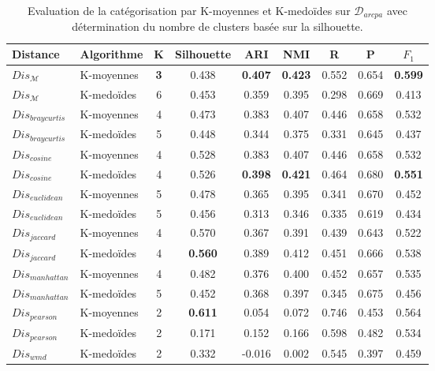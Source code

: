 \begin{table}[!htb]
	\centering \footnotesize
	\begin{tabular}[pos]{|l|l|c|c|c|c|c|c|c|}
		\hline
		{Distance}& {Algorithme}& {K}& {Silhouette}& {ARI} & {NMI} & {R} & {P} & ${F_1}$ \\ \hline
		$Dis_\mathcal{M}$          & K-moyennes    & \textbf{3} & 0.438      & \textbf{0.407} & \textbf{0.423} & 0.552  & 0.654     & \textbf{0.599} \\ \hline
		$Dis_\mathcal{M}$          & K-medoïdes  & 6 & 0.453      & 0.359 & 0.395 & 0.298  & 0.669     & 0.413 \\ \hline
		$Dis_{braycurtis}$ & K-moyennes    & 4 & 0.473      & 0.383 & 0.407 & 0.446  & 0.658     & 0.532 \\ \hline
		$Dis_{braycurtis}$ & K-medoïdes  & 5 & 0.448      & 0.344 & 0.375 & 0.331  & 0.645     & 0.437 \\ \hline
		$Dis_{cosine}$     & K-moyennes    & 4 & 0.528      & 0.383 & 0.407 & 0.446  & 0.658     & 0.532 \\ \hline
		$Dis_{cosine}$     & K-medoïdes  & 4 & 0.526      & \textbf{0.398} & \textbf{0.421} & 0.464  & 0.680     & \textbf{0.551} \\ \hline
		$Dis_{euclidean}$  & K-moyennes    & 5 & 0.478      & 0.365 & 0.395 & 0.341  & 0.670     & 0.452 \\ \hline
		$Dis_{euclidean}$  & K-medoïdes  & 5 & 0.456      & 0.313 & 0.346 & 0.335  & 0.619     & 0.434 \\ \hline
		$Dis_{jaccard}$    & K-moyennes    & 4 & 0.570      & 0.367 & 0.391 & 0.439  & 0.643     & 0.522 \\ \hline
		$Dis_{jaccard}$    & K-medoïdes  & 4 & \textbf{0.560}      & 0.389 & 0.412 & 0.451  & 0.666     & 0.538 \\ \hline
		$Dis_{manhattan}$  & K-moyennes    & 4 & 0.482      & 0.376 & 0.400 & 0.452  & 0.657     & 0.535 \\ \hline
		$Dis_{manhattan}$  & K-medoïdes  & 5 & 0.452      & 0.368 & 0.397 & 0.345  & 0.675     & 0.456 \\ \hline
		$Dis_{pearson}$    & K-moyennes    & 2 & \textbf{0.611}      & 0.054 & 0.072 & 0.746  & 0.453     & 0.564 \\ \hline
		$Dis_{pearson}$    & K-medoïdes  & 2 & 0.171      & 0.152 & 0.166 & 0.598  & 0.482     & 0.534 \\ \hline
		$Dis_{wmd}$      & K-medoïdes  & 2 & 0.332      & -0.016 & 0.002 & 0.545  & 0.397     & 0.459 \\ \hline
	\end{tabular}
	\caption{Evaluation de la catégorisation par K-moyennes et K-medoïdes sur $\mathcal{D}_{arcpa}$ avec détermination du nombre de clusters basée sur la silhouette.} \label{tab:similarite:validation-supervisee-optKbySilhouette}
\end{table}

